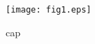 \begin{figure}[htbp]
\begin{center}
\texttt{[image: fig1.eps]}
\end{center}
\caption{cap}
\label{fig}
\end{figure}
